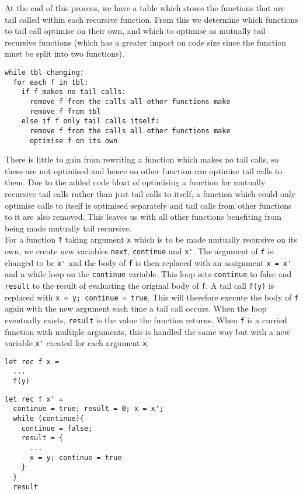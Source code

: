 At the end of this process, we have a table which stores the functions that are tail called within each recursive function. From this we determine which functions to tail call optimise on their own, and which to optimise as mutually tail recursive functions (which has a greater impact on code size since the function must be split into two functions). 
\begin{verbatim}
while tbl changing:
  for each f in tbl:
    if f makes no tail calls:
      remove f from the calls all other functions make
      remove f from tbl
    else if f only tail calls itself:
      remove f from the calls all other functions make
      optimise f on its own
\end{verbatim}
There is little to gain from rewriting a function which makes no tail calls, so these are not optimised and hence no other function can optimise tail calls to them. Due to the added code bloat of optimising a function for mutually recursive tail calls rather than just tail calls to itself, a function which could only optimise calls to itself is optimised separately and tail calls from other functions to it are also removed. This leaves us with all other functions benefiting from being made mutually tail recursive.\\

For a function \verb|f| taking argument \verb|x| which is to be made mutually recursive on its own, we create new variables \verb|next|, \verb|continue| and \verb|x'|. The argument of \verb|f| is changed to be \verb|x'| and the body of \verb|f| is then replaced with an assignment \verb|x = x'| and a while loop on the \verb|continue| variable. This loop sets \verb|continue| to false and \verb|result| to the result of evaluating the original body of \verb|f|. A tail call \verb|f(y)| is replaced with \verb|x = y; continue = true|. This will therefore execute the body of \verb|f| again with the new argument each time a tail call occurs. When the loop eventually exists, \verb|result| is the value the function returns. When \verb|f| is a curried function with multiple arguments, this is handled the same way but with a new variable \verb|x'| created for each argument \verb|x|.

\begin{minipage}{0.3\textwidth}
\begin{verbatim}
let rec f x = 
  ...
  f(y)
\end{verbatim}
\end{minipage}
\hfill
\begin{minipage}{0.6\textwidth}
\begin{verbatim}
let rec f x' = 
  continue = true; result = 0; x = x';
  while (continue){
    continue = false;
    result = {
      ...
      x = y; continue = true
    }
  }
  result
\end{verbatim}
\end{minipage}


